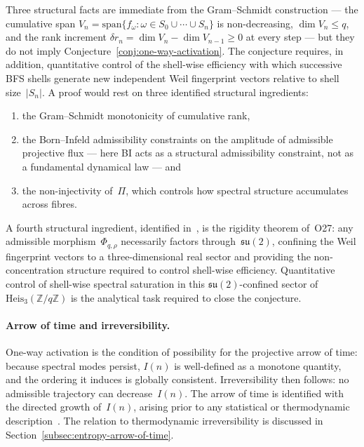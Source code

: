     Three structural facts are immediate from the Gram--Schmidt construction ---
    the cumulative span $V_n = \mathrm{span}\{f_\omega : \omega \in S_0 \cup
\cdots \cup S_n\}$ is non-decreasing, $\dim V_n \le q$, and the rank
    increment $\delta r_n = \dim V_n - \dim V_{n-1} \ge 0$ at every step ---
    but they do not imply Conjecture~\ref{conj:one-way-activation}.
    The conjecture requires, in addition, quantitative control of the
    shell-wise efficiency with which successive BFS shells generate new
    independent Weil fingerprint vectors relative to shell size~$|S_n|$.
    A proof would rest on three identified structural ingredients:
    \begin{enumerate}[label=(\roman*)]
      \item the Gram--Schmidt monotonicity of cumulative rank,
      \item the Born--Infeld admissibility constraints on the amplitude
      of admissible projective flux --- here BI acts as a structural
      admissibility constraint, not as a fundamental dynamical law --- and
      \item the non-injectivity of~$\Pi$, which controls how spectral
      structure accumulates across fibres.
    \end{enumerate}
    A fourth structural ingredient, identified in~\cite{Beau2026a31}, is the
    rigidity theorem of~O27: any admissible morphism~$\Phi_{q,\rho}$ necessarily
    factors through~$\mathfrak{su}(2)$, confining the Weil fingerprint
    vectors to a three-dimensional real sector and providing the non-concentration
    structure required to control shell-wise efficiency.
    Quantitative control of shell-wise spectral saturation in this
    $\mathfrak{su}(2)$-confined sector of~$\mathrm{Heis}_3(\mathbb{Z}/q\mathbb{Z})$
    is the analytical task required to close the conjecture.

  \paragraph{Arrow of time and irreversibility.}
    One-way activation is the condition of possibility for the projective arrow
    of time: because spectral modes persist, $I(n)$ is well-defined as a
    monotone quantity, and the ordering it induces is globally consistent.
    Irreversibility then follows: no admissible trajectory can decrease~$I(n)$.
    The arrow of time is identified with the directed growth of~$I(n)$, arising
    prior to any statistical or thermodynamic
    description~\cite{Prigogine1997,Rovelli1991}.
    The relation to thermodynamic irreversibility is discussed in
    Section~\ref{subsec:entropy-arrow-of-time}.

